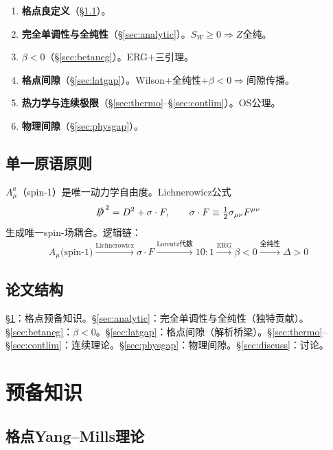 \documentclass[12pt,a4paper]{article}
\theoremstyle{plain}
\theoremstyle{definition}
\theoremstyle{remark}
\begin{document}
\begin{enumerate}[label=\textbf{S\arabic*},leftmargin=3em]
\item \textbf{格点良定义}（\S\ref{sec:lattice}）。
\item \textbf{完全单调性与全纯性}（\S\ref{sec:analytic}）。$S_W\geq 0\Rightarrow Z$全纯。
\item \textbf{$\beta<0$}（\S\ref{sec:betaneg}）。ERG$+$三引理。
\item \textbf{格点间隙}（\S\ref{sec:latgap}）。Wilson$+$全纯性$+\beta<0\Rightarrow$间隙传播。
\item \textbf{热力学与连续极限}（\S\ref{sec:thermo}--\S\ref{sec:contlim}）。OS公理。
\item \textbf{物理间隙}（\S\ref{sec:physgap}）。
\end{enumerate}

\subsection{单一原语原则}\label{sec:primitive}

$A_\mu^a$（spin-1）是唯一动力学自由度。Lichnerowicz公式
\begin{equation}\label{eq:Lich}
\slashed{D}^{\,2} = D^2 + \sigma\cdot F, \qquad \sigma\cdot F \equiv \tfrac{1}{2}\sigma_{\mu\nu}F^{\mu\nu}
\end{equation}
生成唯一spin-场耦合。逻辑链：
\begin{equation}\label{eq:chain}
A_\mu\text{(spin-1)} \xrightarrow{\text{Lichnerowicz}}
\sigma\cdot F \xrightarrow{\text{Lorentz代数}}
10{:}1 \xrightarrow{\text{ERG}}
\beta<0 \xrightarrow{\text{全纯性}}
\Delta>0
\end{equation}

\subsection{论文结构}\label{sec:structure}

\S\ref{sec:prelim}：格点预备知识。\S\ref{sec:analytic}：完全单调性与全纯性（独特贡献）。\S\ref{sec:betaneg}：$\beta<0$。\S\ref{sec:latgap}：格点间隙（解析桥梁）。\S\ref{sec:thermo}--\S\ref{sec:contlim}：连续理论。\S\ref{sec:physgap}：物理间隙。\S\ref{sec:discuss}：讨论。
\section{预备知识}\label{sec:prelim}

\subsection{格点Yang--Mills理论}\label{sec:lattice}
\end{document}
